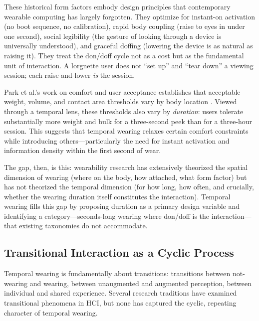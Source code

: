 These historical form factors embody design principles that contemporary wearable computing has largely forgotten. They optimize for instant-on activation (no boot sequence, no calibration), rapid body coupling (raise to eyes in under one second), social legibility (the gesture of looking through a device is universally understood), and graceful doffing (lowering the device is as natural as raising it). They treat the don/doff cycle not as a cost but as the fundamental unit of interaction. A lorgnette user does not ``set up'' and ``tear down'' a viewing session; each raise-and-lower \textit{is} the session.

Park et al.'s work on comfort and user acceptance establishes that acceptable weight, volume, and contact area thresholds vary by body location \cite{park2019comfort}. Viewed through a temporal lens, these thresholds also vary by \textit{duration}: users tolerate substantially more weight and bulk for a three-second peek than for a three-hour session. This suggests that temporal wearing relaxes certain comfort constraints while introducing others---particularly the need for instant activation and information density within the first second of wear.

The gap, then, is this: wearability research has extensively theorized the spatial dimension of wearing (where on the body, how attached, what form factor) but has not theorized the temporal dimension (for how long, how often, and crucially, whether the wearing duration itself constitutes the interaction). Temporal wearing fills this gap by proposing duration as a primary design variable and identifying a category---seconds-long wearing where don/doff is the interaction---that existing taxonomies do not accommodate.

\subsection{Transitional Interaction as a Cyclic Process}

Temporal wearing is fundamentally about transitions: transitions between not-wearing and wearing, between unaugmented and augmented perception, between individual and shared experience. Several research traditions have examined transitional phenomena in HCI, but none has captured the cyclic, repeating character of temporal wearing.

